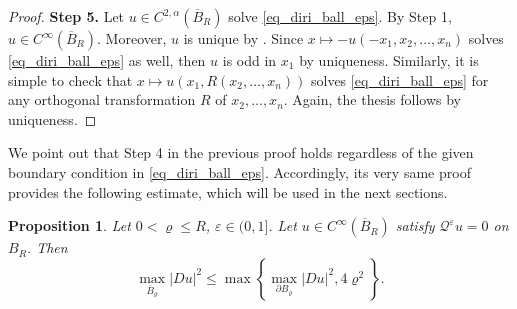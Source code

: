 \documentclass[11pt]{amsart}
\renewcommand{\leq}{\leqslant}
\renewcommand{\le}{<}
\newcommand{\eps}{\varepsilon}
\newcommand{\Qe}{\mathcal Q^\eps}
\newtheorem{proposition}[theorem]{Proposition}
\theoremstyle{definition}
\theoremstyle{remark}
\numberwithin{equation}{section}
\begin{document}
\begin{proof}
\smallskip
\noindent \textbf{Step 5.} Let $u\in C^{2,\alpha}(\overline B_R)$ solve \eqref{eq_diri_ball_eps}. By Step 1, $u\in C^{\infty}(\overline B_R)$. Moreover, $u$ is unique by . Since $x\mapsto -u(-x_1,x_2,\ldots,x_n)$ solves  \eqref{eq_diri_ball_eps} as well, then $u$ is odd in $x_1$ by uniqueness. Similarly, it is simple to check that $x\mapsto u(x_1, R(x_2,\ldots,x_n))$ solves \eqref{eq_diri_ball_eps} for any orthogonal transformation $R$ of $x_2,\ldots,x_n$. Again, the thesis follows by uniqueness. 
\end{proof}
We point out that Step 4 in the previous proof holds regardless of the given boundary condition in \eqref{eq_diri_ball_eps}. Accordingly, its very same proof provides the following estimate, which will be used in the next sections. 
\begin{proposition}\label{quasimaximumprincipleproposition}
    Let $0\le \varrho\leq R$, $\eps\in (0,1]$. Let $u\in C^\infty(\overline B_R)$ satisfy $\Qe u=0$ on $B_R$. Then  
\begin{equation}\label{quasi_max_principle_in_proposition}
    \max_{\overline B_\varrho} |Du|^2\leq \max\left\{ \max_{\partial B_\varrho} |Du|^2,4\varrho^2\right\}.
\end{equation}
\end{proposition}
\end{document}
